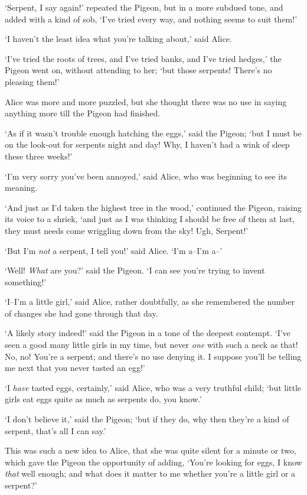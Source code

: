  `Serpent, I say again!' repeated the Pigeon, but in a more
subdued tone, and added with a kind of sob, `I've tried every
way, and nothing seems to suit them!'

  `I haven't the least idea what you're talking about,' said
Alice.

  `I've tried the roots of trees, and I've tried banks, and I've
tried hedges,' the Pigeon went on, without attending to her; `but
those serpents!  There's no pleasing them!'

  Alice was more and more puzzled, but she thought there was no
use in saying anything more till the Pigeon had finished.

  `As if it wasn't trouble enough hatching the eggs,' said the
Pigeon; `but I must be on the look-out for serpents night and
day!  Why, I haven't had a wink of sleep these three weeks!'

  `I'm very sorry you've been annoyed,' said Alice, who was
beginning to see its meaning.

  `And just as I'd taken the highest tree in the wood,' continued
the Pigeon, raising its voice to a shriek, `and just as I was
thinking I should be free of them at last, they must needs come
wriggling down from the sky!  Ugh, Serpent!'

  `But I'm {\it not} a serpent, I tell you!' said Alice.  `I'm a--I'm
a--'

  `Well!  {\it What} are you?' said the Pigeon.  `I can see you're
trying to invent something!'

  `I--I'm a little girl,' said Alice, rather doubtfully, as she
remembered the number of changes she had gone through that day.

  `A likely story indeed!' said the Pigeon in a tone of the
deepest contempt.  `I've seen a good many little girls in my
time, but never {\it one} with such a neck as that!  No, no!  You're a
serpent; and there's no use denying it.  I suppose you'll be
telling me next that you never tasted an egg!'

  `I {\it have} tasted eggs, certainly,' said Alice, who was a very
truthful child; `but little girls eat eggs quite as much as
serpents do, you know.'

  `I don't believe it,' said the Pigeon; `but if they do, why
then they're a kind of serpent, that's all I can say.'

  This was such a new idea to Alice, that she was quite silent
for a minute or two, which gave the Pigeon the opportunity of
adding, `You're looking for eggs, I know {\it that} well enough; and
what does it matter to me whether you're a little girl or a
serpent?'

